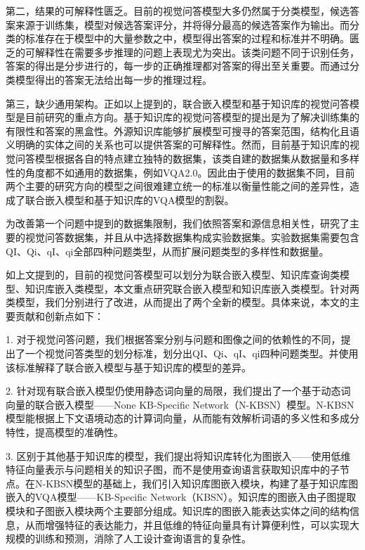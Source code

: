 第二，结果的可解释性匮乏。目前的视觉问答模型大多仍然属于分类模型，候选答案来源于训练集，模型对候选答案评分，并将得分最高的候选答案作为输出。而分类的标准存在于模型中的大量参数之中，模型得出答案的过程和标准并不明确。匮乏的可解释性在需要多步推理的问题上表现尤为突出。该类问题不同于识别任务，答案的得出是分步进行的，每一步的正确推理都对答案的得出至关重要。而通过分类模型得出的答案无法给出每一步的推理过程。

第三，缺少通用架构。正如以上提到的，联合嵌入模型和基于知识库的视觉问答模型是目前研究的重点方向。基于知识库的视觉问答模型的提出是为了解决训练集的有限性和答案的黑盒性。外源知识库能够扩展模型可搜寻的答案范围，结构化且语义明确的实体之间的关系也可以提供答案的可解释性。然而，目前基于知识库的视觉问答模型根据各自的特点建立独特的数据集，该类自建的数据集从数据量和多样性的角度都不如通用的数据集，例如VQA2.0。因此由于使用的数据集不同，目前两个主要的研究方向的模型之间很难建立统一的标准以衡量性能之间的差异性，造成了联合嵌入模型和基于知识库的VQA模型的割裂。

为改善第一个问题中提到的数据集限制，我们依照答案和源信息相关性，研究了主要的视觉问答数据集，并且从中选择数据集构成实验数据集。实验数据集需要包含QI、Qi、qI、qi全部四种问题类型，从而扩展问题类型的多样性和数据量。

如上文提到的，目前的视觉问答模型可以划分为联合嵌入模型、知识库查询类模型、知识库嵌入类模型，本文重点研究联合嵌入模型和知识库嵌入类模型。针对两类模型，我们分别进行了改进，从而提出了两个全新的模型。具体来说，本文的主要贡献和创新点如下：

1. 对于视觉问答问题，我们根据答案分别与问题和图像之间的依赖性的不同，提出了一个视觉问答类型的划分标准，划分出QI、Qi、qI、qi四种问题类型。并使用该标准解释了联合嵌入模型与基于知识库的模型的差异。

2. 针对现有联合嵌入模型仍使用静态词向量的局限，我们提出了一个基于动态词向量的联合嵌入模型——None KB-Specific Network（N-KBSN）模型。N-KBSN模型能根据上下文语境动态的计算词向量，从而能有效解析词语的多义性和多成分特性，提高模型的准确性。

3. 区别于其他基于知识库的模型，我们提出将知识库转化为图嵌入——使用低维特征向量表示与问题相关的知识子图，而不是使用查询语言获取知识库中的子节点。在N-KBSN模型的基础上，我们引入知识库图嵌入模块，构建了基于知识库图嵌入的VQA模型——KB-Specific Network（KBSN）。知识库的图嵌入由子图提取模块和子图嵌入模块两个主要部分组成。知识库的图嵌入能表达实体之间的结构信息，从而增强特征的表达能力，并且低维的特征向量具有计算便利性，可以实现大规模的训练和预测，消除了人工设计查询语言的复杂性。

